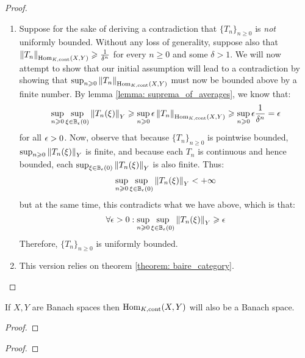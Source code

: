             \begin{proof}
                \begin{enumerate}
                    \item Suppose for the sake of deriving a contradiction that $\{T_n\}_{n \geq 0}$ is \textit{not} uniformly bounded. Without any loss of generality, suppose also that $\left\| {T_n} \right\|_{\mathrm{Hom}_{K, \mathrm{cont}}(X, Y)} \geqslant \frac{1}{\delta^n}$ for every $n \geq 0$ and some $\delta > 1$. We will now attempt to show that our initial assumption will lead to a contradiction by showing that $\sup_{n \geqslant 0} \left\| {T_n} \right\|_{\mathrm{Hom}_{K, \mathrm{cont}}(X, Y)}$ must now be bounded above by a finite number. By lemma \ref{lemma: suprema_of_averages}, we know that:
                        $$\sup_{n \geqslant 0} \sup_{\xi \in \mathbb{B}_{\epsilon}(0)} \left\| {T_n(\xi)} \right\|_Y \geqslant \sup_{n \geqslant 0} \epsilon \left\| {T_n} \right\|_{\mathrm{Hom}_{K, \mathrm{cont}}(X, Y)} \geqslant \sup_{n \geqslant 0} \epsilon \frac{1}{\delta^n} = \epsilon$$
                    for all $\epsilon > 0$. Now, observe that because $\{T_n\}_{n \geq 0}$ is pointwise bounded, $\sup_{n \geqslant 0} \left\| {T_n(\xi)} \right\|_Y$ is finite, and because each $T_n$ is continuous and hence bounded, each $\sup_{\xi \in \mathbb{B}_{\epsilon}(0)} \left\| {T_n(\xi)} \right\|_Y$ is also finite. Thus:
                        $$\sup_{n \geqslant 0} \sup_{\xi \in \mathbb{B}_{\epsilon}(0)} \left\| {T_n(\xi)} \right\|_Y < +\infty$$
                    but at the same time, this contradicts what we have above, which is that:
                        $$\forall \epsilon > 0: \sup_{n \geqslant 0} \sup_{\xi \in \mathbb{B}_{\epsilon}(0)} \left\| {T_n(\xi)} \right\|_Y \geqslant \epsilon$$
                    Therefore, $\{T_n\}_{n \geq 0}$ is uniformly bounded.
                    \item This version relies on theorem \ref{theorem: baire_category}. 
                \end{enumerate}
            \end{proof}
        \begin{corollary} \label{coro: hom_between_banach_spaces_are_banach_spaces}
            If $X, Y$ are Banach spaces then $\mathrm{Hom}_{K, \mathrm{cont}}(X, Y)$ will also be a Banach space.
        \end{corollary}
            \begin{proof}
                
            \end{proof}

        \begin{theorem} \label{theorem: open_mapping}
            
        \end{theorem}
            \begin{proof}
                
            \end{proof}

